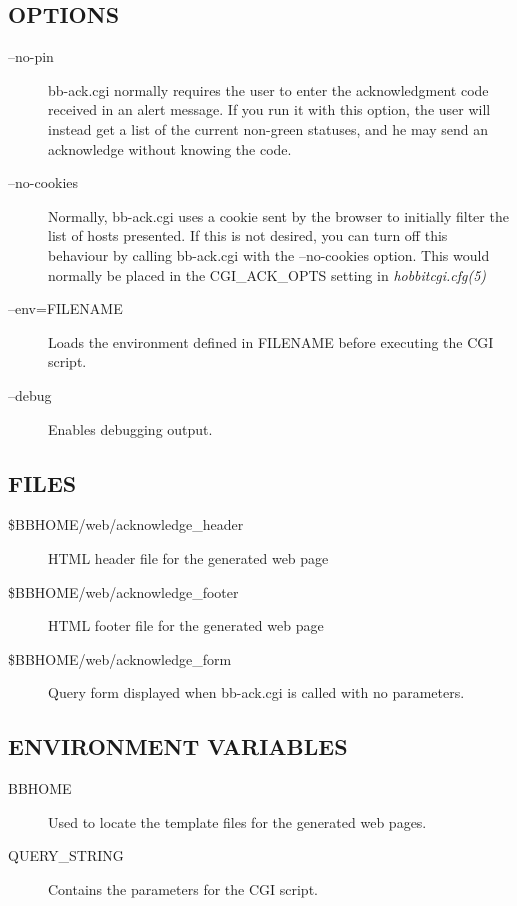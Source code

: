 \subsection{OPTIONS}
\begin{description}
\item[--no-pin] bb-ack.cgi normally requires the user to enter the
  acknowledgment code received in an alert message. If you run it with
  this option, the user will instead get a list of the current
  non-green statuses, and he may send an acknowledge without knowing
  the code. 


 

\item[--no-cookies] Normally, bb-ack.cgi uses a cookie sent by the
  browser to initially filter the list of hosts presented. If this is
  not desired, you can turn off this behaviour by calling bb-ack.cgi
  with the --no-cookies option. This would normally be placed in the
  CGI\_ACK\_OPTS setting in \emph{hobbitcgi.cfg(5)}



 
\item[--env=FILENAME] Loads the environment defined in FILENAME before executing the CGI script. 

 

\item[--debug] Enables debugging output. 

 


\end{description}
\subsection{FILES}
\begin{description}
\item[\$BBHOME/web/acknowledge\_header] HTML header file for the generated web page 

 

\item[\$BBHOME/web/acknowledge\_footer] HTML footer file for the generated web page 

 

\item[\$BBHOME/web/acknowledge\_form] Query form displayed when bb-ack.cgi is called with no parameters. 

 
\end{description}
\subsection{ENVIRONMENT VARIABLES}
\begin{description}
\item[BBHOME] Used to locate the template files for the generated web pages. 

 

\item[QUERY\_STRING] Contains the parameters for the CGI script. 

 


\end{description}
